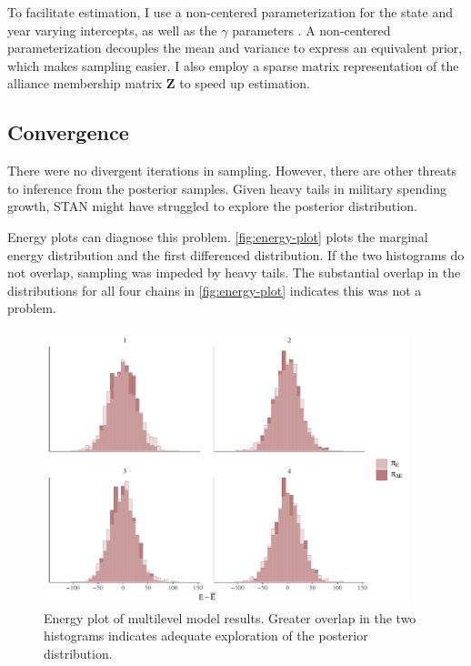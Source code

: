 \documentclass[12pt]{article}
\begin{document}
To facilitate estimation, I use a non-centered parameterization for the state and year varying intercepts, as well as the $\gamma$ parameters \citep{BetancourtGirolani2015}. 
A non-centered parameterization decouples the mean and variance to express an equivalent prior, which makes sampling easier. 
I also employ a sparse matrix representation of the alliance membership matrix $\textbf{Z}$ to speed up estimation. 


\subsection{Convergence} 


There were no divergent iterations in sampling. 
However, there are other threats to inference from the posterior samples. 
Given heavy tails in military spending growth, STAN might have struggled to explore the posterior distribution. 


Energy plots can diagnose this problem. 
\autoref{fig:energy-plot} plots the marginal energy distribution and the first differenced distribution. 
If the two histograms do not overlap, sampling was impeded by heavy tails. 
The substantial overlap in the distributions for all four chains in \autoref{fig:energy-plot} indicates this was not a problem. 


\begin{figure}
	\centering
		\includegraphics[width=0.95\textwidth]{energy-plot.pdf}
	\caption{Energy plot of multilevel model results. Greater overlap in the two histograms indicates adequate exploration of the posterior distribution. }
	\label{fig:energy-plot}
\end{figure}
\end{document}
